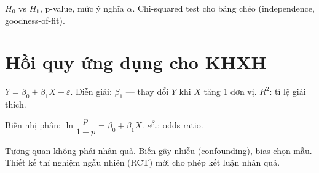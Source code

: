 \documentclass[12pt,a4paper]{article}
\begin{document}
\begin{phuongphap}[title={Kiểm định giả thuyết}]
  $H_0$ vs $H_1$, p-value, mức ý nghĩa $\alpha$. Chi-squared test cho bảng chéo (independence, goodness-of-fit).
\end{phuongphap}

\section{Hồi quy ứng dụng cho KHXH}

\begin{dinhnghia}[title={Hồi quy tuyến tính}]
  $Y = \beta_0 + \beta_1 X + \varepsilon$. Diễn giải: $\beta_1$ --- thay đổi $Y$ khi $X$ tăng 1 đơn vị. $R^2$: tỉ lệ giải thích.
\end{dinhnghia}

\begin{dinhnghia}[title={Hồi quy logistic}]
  Biến nhị phân: $\ln\dfrac{p}{1-p} = \beta_0 + \beta_1 X$. $e^{\beta_1}$: odds ratio.
\end{dinhnghia}

\begin{luuy}
  Tương quan không phải nhân quả. Biến gây nhiễu (confounding), bias chọn mẫu. Thiết kế thí nghiệm ngẫu nhiên (RCT) mới cho phép kết luận nhân quả.
\end{luuy}
\end{document}
